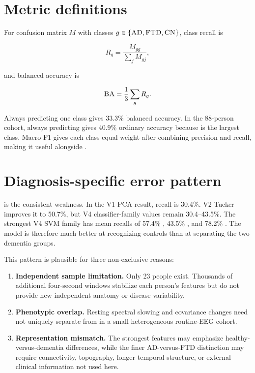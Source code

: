 \section{Metric definitions}

For confusion matrix $M$ with classes $g\in\{\textsc{AD},\textsc{FTD},\textsc{CN}\}$, class recall is

\begin{equation}
R_g=\frac{M_{gg}}{\sum_j M_{gj}},
\end{equation}

and balanced accuracy is

\begin{equation}
\textsc{BA}=\frac{1}{3}\sum_g R_g.
\end{equation}

Always predicting one class gives 33.3\% balanced accuracy. In the 88-person
cohort, always predicting \AD{} gives 40.9\% ordinary accuracy because \AD{} is
the largest class. Macro F1 gives each class equal weight after combining
precision and recall, making it useful alongside \BA{}.

\section{Diagnosis-specific error pattern}

\FTD{} is the consistent weakness. In the V1 PCA result, \FTD{} recall is
30.4\%. V2 Tucker improves it to 50.7\%, but V4 classifier-family values remain
30.4--43.5\%. The strongest V4 SVM family has mean recalls of 57.4\% \AD{},
43.5\% \FTD{}, and 78.2\% \CN{}. The model is therefore much better at
recognizing controls than at separating the two dementia groups.

This pattern is plausible for three non-exclusive reasons:

\begin{enumerate}
  \item \textbf{Independent sample limitation.} Only 23 \FTD{} people exist.
  Thousands of additional four-second windows stabilize each person's features
  but do not provide new independent anatomy or disease variability.
  \item \textbf{Phenotypic overlap.} Resting spectral slowing and covariance
  changes need not uniquely separate \AD{} from \FTD{} in a small heterogeneous
  routine-EEG cohort.
  \item \textbf{Representation mismatch.} The strongest features may emphasize
  healthy-versus-dementia differences, while the finer AD-versus-FTD distinction
  may require connectivity, topography, longer temporal structure, or external
  clinical information not used here.
\end{enumerate}

